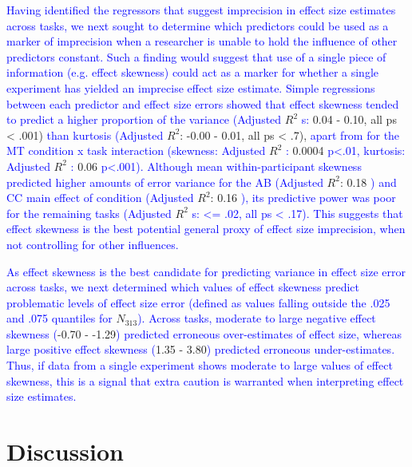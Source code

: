 \documentclass[
  man]{apa6}
\begin{document}
\textcolor{blue}{Having identified the regressors that suggest imprecision in effect size estimates across tasks, we next sought to determine which predictors could be used as a marker of imprecision when a researcher is unable to hold the influence of other predictors constant. Such a finding would suggest that use of a single piece of information (e.g. effect skewness) could act as a marker for whether a single experiment has yielded an imprecise effect size estimate. Simple regressions between each predictor and effect size errors showed that effect skewness tended to predict a higher proportion of the variance (Adjusted} \(R^2\) \textcolor{blue}{s:} 0.04 - 0.10, all ps \textless{} .001) \textcolor{blue}{than kurtosis (Adjusted} \(R^2\): -0.00 - 0.01, all ps \textless{} .7), \textcolor{blue}{apart from for the MT condition x task interaction (skewness: Adjusted} \(R^2\) \textcolor{blue}{:} 0.0004 \textcolor{blue}{p<.01, kurtosis: Adjusted} \(R^2\) \textcolor{blue}{:} 0.06 \textcolor{blue}{p<.001). Although mean within-participant skewness predicted higher amounts of error variance for the AB (Adjusted} \(R^2\): 0.18 \textcolor{blue}{) and CC main effect of condition (Adjusted} \(R^2\): 0.16 \textcolor{blue}{), its predictive power was poor for the remaining tasks (Adjusted} \(R^2\) \textcolor{blue}{s: <= .02, all ps < .17). This suggests that effect skewness is the best potential general proxy of effect size imprecision, when not controlling for other influences.}

\textcolor{blue}{As effect skewness is the best candidate for predicting variance in effect size error across tasks, we next determined which values of effect skewness predict problematic levels of effect size error (defined as values falling outside the .025 and .075 quantiles for} \(N_{313}\)\textcolor{blue}{). Across tasks, moderate to large negative effect skewness (}-0.70 - -1.29\textcolor{blue}{) predicted erroneous over-estimates of effect size, whereas large positive effect skewness (}1.35 - 3.80\textcolor{blue}{) predicted erroneous under-estimates. Thus, if data from a single experiment shows moderate to large values of effect skewness, this is a signal that extra caution is warranted when interpreting effect size estimates.}

\hypertarget{discussion}{%
\section{Discussion}\label{discussion}}

\label{sec:Discussion}
\end{document}
